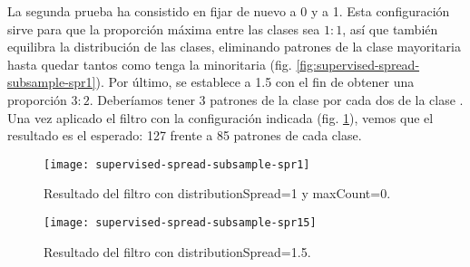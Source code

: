 La segunda prueba ha consistido en fijar de nuevo  a 0 y a 1. Esta configuración sirve para que la proporción máxima entre las clases sea $1:1$, así que también equilibra la distribución de las clases, eliminando patrones de la clase mayoritaria hasta quedar tantos como tenga la minoritaria (fig. \ref{fig:supervised-spread-subsample-spr1}). Por último, se establece  a 1.5 con el fin de obtener una proporción $3:2$. Deberíamos tener 3 patrones de la clase  por cada dos de la clase . Una vez aplicado el filtro con la configuración indicada (fig. \ref{fig:supervised-spread-subsample-spr1.5}), vemos que el resultado es el esperado: 127 frente a 85 patrones de cada clase.

\begin{figure}[H]
    \centering
    \begin{minipage}{0.50\textwidth}
        \centering
        \texttt{[image: supervised-spread-subsample-spr1]}
        \caption{Resultado del filtro con distributionSpread=1 y maxCount=0.}
        \label{fig:supervised-spread-subsample-spr1}
    \end{minipage}\hfill
    \begin{minipage}{0.50\textwidth}
        \centering
        \texttt{[image: supervised-spread-subsample-spr15]}
        \caption{Resultado del filtro con distributionSpread=1.5.}
        \label{fig:supervised-spread-subsample-spr1.5}
    \end{minipage}
\end{figure}
